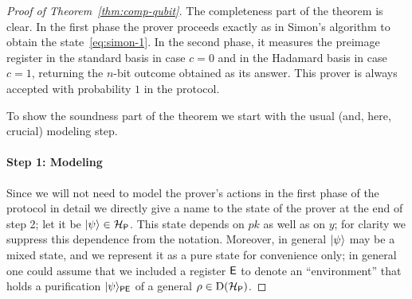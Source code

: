 \begin{proof}[Proof of Theorem~\ref{thm:comp-qubit}]
The completeness part of the theorem is clear. In the first phase the prover proceeds exactly as in Simon's algorithm to obtain the state~\eqref{eq:simon-1}. In the second phase, it measures the preimage register in the standard basis in case $c=0$ and in the Hadamard basis in case $c=1$, returning the $n$-bit outcome obtained as its answer. This prover is always accepted with probability $1$ in the protocol. 

To show the soundness part of the theorem we start with the usual (and, here, crucial) modeling step. 

\paragraph{Step 1: Modeling} Since we will not need to model the prover's actions in the  first phase of the protocol in detail we directly give a name to the state of the prover at the end of step 2; let it be $|\psi\rangle \in  \mathcal{H}_{{\textsf{P}}}$. This state depends on $pk$ as well as on $y$; for clarity we suppress this dependence from the notation. Moreover, in general $|\psi\rangle$ may be a mixed state, and we represent it as a pure state for convenience only; in general one could assume that we included a register ${\textsf{E}}$ to denote an ``environment'' that holds a purification $|\psi\rangle_{{\textsf{PE}}}$ of a general $\rho \in \mathrm{D}(\mathcal{H}_{{\textsf{P}}})$. 


\end{proof}
